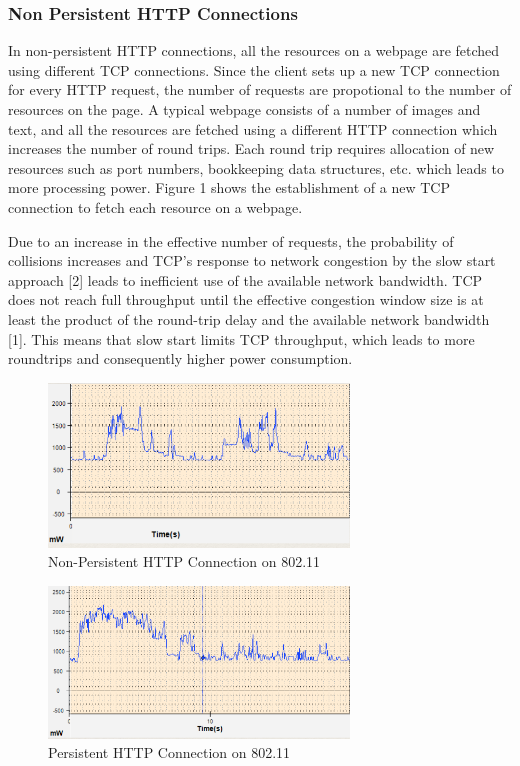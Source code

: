 \documentclass{sigplanconf}
\begin{document}
\subsubsection{ Non Persistent HTTP Connections}

In non-persistent HTTP connections, all the resources on a webpage are fetched using different TCP connections. Since the client sets up a new TCP connection for every HTTP request, the number of requests are propotional to the number of resources on the page. A typical webpage consists of a number of images and text, and all the resources are fetched using a different HTTP connection which increases the number of round trips. Each round trip requires allocation of new resources such as port numbers, bookkeeping data structures, etc. which leads to more processing power. Figure 1 shows the establishment of a new TCP connection to fetch each resource on a webpage.

Due to an increase in the effective number of requests, the probability of collisions increases and TCP’s response to network congestion by the slow start approach [2] leads to inefficient use of the available network bandwidth. TCP does not reach full throughput until the effective congestion window size is at least the product of the round-trip delay and the available network bandwidth [1]. This means that slow start limits TCP throughput, which leads to more roundtrips and consequently higher power consumption.

\begin{figure}[ht!]
\centering
\includegraphics[width=80mm]{powerconsumption2.png}
\caption{Non-Persistent HTTP Connection on 802.11}
\label{fig:sp_gd_mnist}
\end{figure}

\begin{figure}[ht!]
\centering
\includegraphics[width=80mm]{powerconsumption1.png}
\caption{Persistent HTTP Connection on 802.11}
\label{fig:sp_gd_mnist}
\end{figure}
\end{document}
